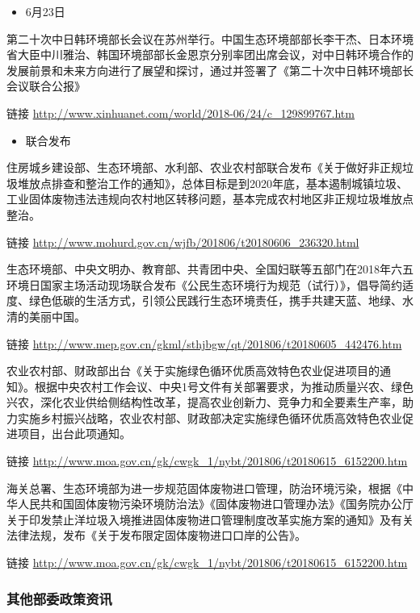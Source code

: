 \documentclass[]{book}
\providecommand{\tightlist}{%
  \setlength{\itemsep}{0pt}\setlength{\parskip}{0pt}}
\begin{document}
\begin{itemize}
\tightlist
\item
  6月23日
\end{itemize}

第二十次中日韩环境部长会议在苏州举行。中国生态环境部部长李干杰、日本环境省大臣中川雅治、韩国环境部部长金恩京分别率团出席会议，对中日韩环境合作的发展前景和未来方向进行了展望和探讨，通过并签署了《第二十次中日韩环境部长会议联合公报》

链接 \url{http://www.xinhuanet.com/world/2018-06/24/c_129899767.htm}

\begin{itemize}
\tightlist
\item
  联合发布
\end{itemize}

住房城乡建设部、生态环境部、水利部、农业农村部联合发布《关于做好非正规垃圾堆放点排查和整治工作的通知》，总体目标是到2020年底，基本遏制城镇垃圾、工业固体废物违法违规向农村地区转移问题，基本完成农村地区非正规垃圾堆放点整治。

链接 \url{http://www.mohurd.gov.cn/wjfb/201806/t20180606_236320.html}

生态环境部、中央文明办、教育部、共青团中央、全国妇联等五部门在2018年六五环境日国家主场活动现场联合发布《公民生态环境行为规范（试行）》，倡导简约适度、绿色低碳的生活方式，引领公民践行生态环境责任，携手共建天蓝、地绿、水清的美丽中国。

链接
\url{http://www.mep.gov.cn/gkml/sthjbgw/qt/201806/t20180605_442476.htm}

农业农村部、财政部出台《关于实施绿色循环优质高效特色农业促进项目的通知》。根据中央农村工作会议、中央1号文件有关部署要求，为推动质量兴农、绿色兴农，深化农业供给侧结构性改革，提高农业创新力、竞争力和全要素生产率，助力实施乡村振兴战略，农业农村部、财政部决定实施绿色循环优质高效特色农业促进项目，出台此项通知。

链接
\url{http://www.moa.gov.cn/gk/cwgk_1/nybt/201806/t20180615_6152200.htm}

海关总署、生态环境部为进一步规范固体废物进口管理，防治环境污染，根据《中华人民共和国固体废物污染环境防治法》《固体废物进口管理办法》《国务院办公厅关于印发禁止洋垃圾入境推进固体废物进口管理制度改革实施方案的通知》及有关法律法规，发布《关于发布限定固体废物进口口岸的公告》。

链接
\url{http://www.moa.gov.cn/gk/cwgk_1/nybt/201806/t20180615_6152200.htm}

\subsubsection*{其他部委政策资讯}\label{-2}
\end{document}
